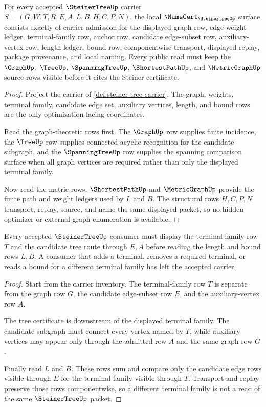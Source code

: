 \begin{theorem}
\label{thm:steiner-tree-namecert-obligations}
For every accepted $\SteinerTreeUp$ carrier
$S=(G,W,T,R,E,A,L,B,H,C,P,N)$, the local
$\NameCert_{\SteinerTreeUp}$ surface consists exactly of carrier admission for
the displayed graph row, edge-weight ledger, terminal-family row, anchor row,
candidate edge-subset row, auxiliary-vertex row, length ledger, bound row,
componentwise transport, displayed replay, package provenance, and local
naming. Every public read must keep the $\GraphUp$, $\TreeUp$,
$\SpanningTreeUp$, $\ShortestPathUp$, and $\MetricGraphUp$ source rows visible
before it cites the Steiner certificate.
\end{theorem}
\begin{proof}
Project the carrier of \autoref{def:steiner-tree-carrier}. The graph,
weights, terminal family, candidate edge set, auxiliary vertices, length, and
bound rows are the only optimization-facing coordinates.

Read the graph-theoretic rows first. The $\GraphUp$ row supplies finite
incidence, the $\TreeUp$ row supplies connected acyclic recognition for the
candidate subgraph, and the $\SpanningTreeUp$ row supplies the spanning
comparison surface when all graph vertices are required rather than only the
displayed terminal family.

Now read the metric rows. $\ShortestPathUp$ and $\MetricGraphUp$ provide the
finite path and weight ledgers used by $L$ and $B$. The structural rows
$H,C,P,N$ transport, replay, source, and name the same displayed packet, so no
hidden optimizer or external graph enumeration is available.
\end{proof}

\begin{theorem}
\label{thm:steiner-tree-finite-terminal-nonescape}
Every accepted $\SteinerTreeUp$ consumer must display the terminal-family row
$T$ and the candidate tree route through $E,A$ before reading the length and
bound rows $L,B$. A consumer that adds a terminal, removes a required terminal,
or reads a bound for a different terminal family has left the accepted carrier.
\end{theorem}
\begin{proof}
Start from the carrier inventory. The terminal-family row $T$ is separate from
the graph row $G$, the candidate edge-subset row $E$, and the auxiliary-vertex
row $A$.

The tree certificate is downstream of the displayed terminal family. The
candidate subgraph must connect every vertex named by $T$, while auxiliary
vertices may appear only through the admitted row $A$ and the same graph row
$G$.

Finally read $L$ and $B$. These rows sum and compare only the candidate edge
rows visible through $E$ for the terminal family visible through $T$.
Transport and replay preserve those rows componentwise, so a different
terminal family is not a read of the same $\SteinerTreeUp$ packet.
\end{proof}

